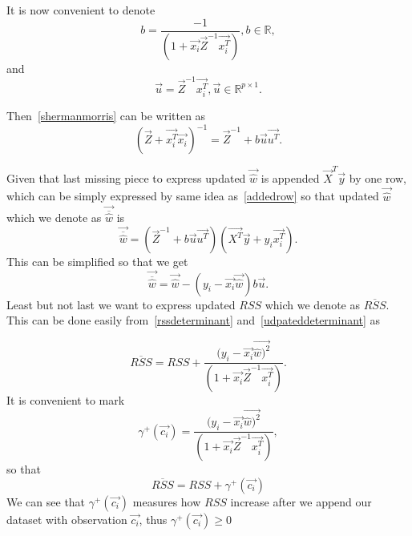 It is now convenient to denote 
\begin{equation}
    b = \dfrac{-1}{(1 + \vec{x_i}\vec{Z}^{-1}\vec{x_i^T})},  b \in \mathbb{R},
\end{equation}
and 
\begin{equation} \label{agullo_u}
    \vec{u} = \vec{Z}^{-1}\vec{x_i^T},      \vec{u} \in \mathbb{R}^{p \times 1}.
\end{equation}

Then~\eqref{shermanmorris} can be written as
\begin{equation} \label{inversionplus}
    (\vec{Z} + \vec{x_i^T}\vec{x_i})^{-1} = \vec{Z}^{-1} + b\vec{u}\vec{u^T}.
\end{equation}

Given that last missing piece to express updated $\vec{\hat{w}}$ is appended $\vec{X}^T\vec{y}$ by one row, which can be simply expressed by same idea as~\eqref{addedrow} so that updated $\vec{\hat{w}}$ which we denote as $\vec{\overline{\hat{w}}}$ is 
\begin{equation}
    \vec{\overline{\hat{w}}} = (\vec{Z}^{-1} + b\vec{u}\vec{u^T})(\vec{X^T}\vec{y} + y_i\vec{x_i^T}).
\end{equation}
This can be simplified so that we get
\begin{equation} \label{thetaplus}
    \vec{\overline{\hat{w}}} = \vec{\hat{w}} - (y_i - \vec{x_i}\vec{\hat{w}})b\vec{u}.
\end{equation}
Least but not last we want to express updated $RSS$ which we denote as $\overline{RSS}$. This can be done easily from~\eqref{rssdeterminant} and~\eqref{udpateddeterminant} as 

\begin{equation}
    \overline{RSS} =  RSS + \dfrac{(y_i - \vec{x_i}\vec{\hat{w})^2}}{(1 + \vec{x_i}\vec{Z}^{-1}\vec{x_i^T})}.
\end{equation}
It is convenient to mark 
\begin{equation} \label{gamma:plus}
    \gamma^{+}(\vec{c_i}) = \dfrac{(y_i - \vec{x_i}\vec{\hat{w})^2}}{(1 + \vec{x_i}\vec{Z}^{-1}\vec{x_i^T})},
\end{equation}
so that 
\begin{equation} \label{rssplus}
    \overline{RSS} =  RSS + \gamma^{+}(\vec{c_i})
\end{equation}
We can see that $\gamma^{+}(\vec{c_i})$ measures how $RSS$ increase after we append our dataset with observation $\vec{c_i}$, thus $\gamma^{+}(\vec{c_i}) \geq 0$



